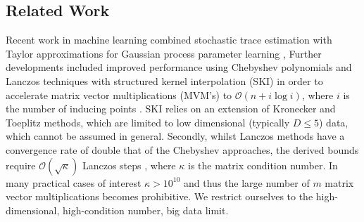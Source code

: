 \documentclass[letterpaper]{article} %
\begin{document}
\subsection{Related Work}
Recent work in machine learning combined stochastic trace estimation with Taylor approximations for Gaussian process parameter learning \cite{zhang2007approximate, boutsidis2017randomized}, %
Further developments included improved performance using Chebyshev polynomials \cite{han2015large} and Lanczos techniques with structured kernel interpolation (SKI) in order to accelerate matrix vector multiplications (MVM's) to $\mathcal{O}(n+i\log i)$, where $i$ is the number of inducing points \cite{dong2017scalable}. SKI relies on an extension of Kronecker and Toeplitz methods, which are limited to low dimensional (typically $D \leq 5$) data, which cannot be assumed in general.  Secondly, whilst Lanczos methods have a convergence rate of double that of the Chebyshev approaches, the derived bounds require $\mathcal{O}(\sqrt{\kappa})$ Lanczos steps \cite{Ubaru2016}, where $\kappa$ is the matrix condition number. In many practical cases of interest $\kappa > 10^{10}$ and thus the large number of $m$ matrix vector multiplications becomes prohibitive. 
We restrict ourselves to the high-dimensional, high-condition number, big data limit. 
\end{document}
